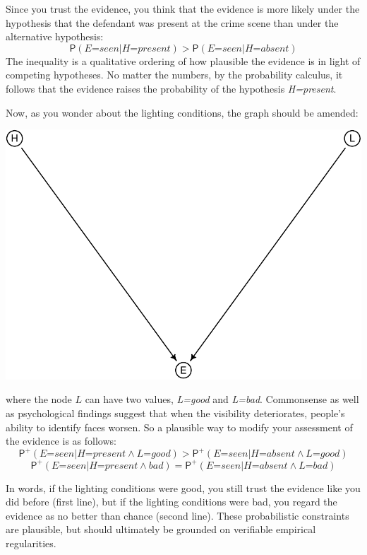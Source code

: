 \documentclass[
  11pt,
  dvipsnames,enabledeprecatedfontcommands]{scrartcl}
\newcommand{\pr}[1]{\ensuremath{\mathsf{P}(#1)}}
\newcommand{\ppr}[2]{\ensuremath{\mathsf{P}^{#1}(#2)}}
\begin{document}
\noindent Since you trust the evidence, you think that the evidence is
more likely under the hypothesis that the defendant was present at the
crime scene than under the alternative hypothesis:
\[\pr{\textit{E=seen} \vert \textit{H=present}} > \pr{\textit{E=seen} \vert \textit{H=absent}}\]
The inequality is a qualitative ordering of how plausible the evidence
is in light of competing hypotheses. No matter the numbers, by the
probability calculus, it follows that the evidence raises the
probability of the hypothesis \textit{H=present}.

Now, as you wonder about the lighting conditions, the graph should be
amended:

\begin{center}\includegraphics[width=0.5\linewidth,height=0.3\textheight]{ReplyToSteeleStefansson5_files/figure-latex/lighting2DAG-1} \end{center}

\noindent where the node \(L\) can have two values, \textit{L=good} and
\textit{L=bad}. Commonsense as well as psychological findings suggest
that when the visibility deteriorates, people's ability to identify
faces worsen. So a plausible way to modify your assessment of the
evidence is as follows:
\[\ppr{+}{\textit{E=seen} \vert \textit{H=present} \wedge \textit{L=good}} > \ppr{+}{\textit{E=seen} \vert \textit{H=absent} \wedge \textit{L=good}}\]
\[\ppr{+}{\textit{E=seen} \vert \textit{H=present} \wedge \textit{bad}} = \ppr{+}{\textit{E=seen} \vert \textit{H=absent} \wedge \textit{L=bad}}\]

\noindent In words, if the lighting conditions were good, you still
trust the evidence like you did before (first line), but if the lighting
conditions were bad, you regard the evidence as no better than chance
(second line). These probabilistic constraints are plausible, but should
ultimately be grounded on verifiable empirical regularities.
\end{document}
